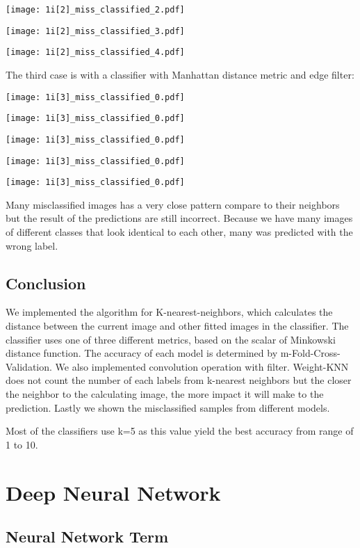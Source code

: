 \documentclass[11pt]{article}
\begin{document}
\texttt{[image: 1i[2]\_miss\_classified\_2.pdf]}

\texttt{[image: 1i[2]\_miss\_classified\_3.pdf]}

\texttt{[image: 1i[2]\_miss\_classified\_4.pdf]}

The third case is with a classifier with Manhattan distance metric and edge filter:

\texttt{[image: 1i[3]\_miss\_classified\_0.pdf]}

\texttt{[image: 1i[3]\_miss\_classified\_0.pdf]}

\texttt{[image: 1i[3]\_miss\_classified\_0.pdf]}

\texttt{[image: 1i[3]\_miss\_classified\_0.pdf]}

\texttt{[image: 1i[3]\_miss\_classified\_0.pdf]}

Many misclassified images has a very close pattern compare to their neighbors but the result of the predictions are still incorrect. Because we have many images of different classes that look identical to each other, many was predicted with the wrong label.

\subsection{Conclusion}

We implemented the algorithm for K-nearest-neighbors, which calculates the distance between the current image and other fitted images in the classifier. The classifier uses one of three different metrics, based on the scalar of Minkowski distance function. The accuracy of each model is determined by m-Fold-Cross-Validation. We also implemented convolution operation with filter. Weight-KNN does not count the number of each labels from k-nearest neighbors but the closer the neighbor to the calculating image, the more impact it will make to the prediction. Lastly we shown the misclassified samples from different models.

Most of the classifiers use k=5 as this value yield the best accuracy from range of 1 to 10.



\section{Deep Neural Network}
\subsection{Neural Network Term}
\end{document}
